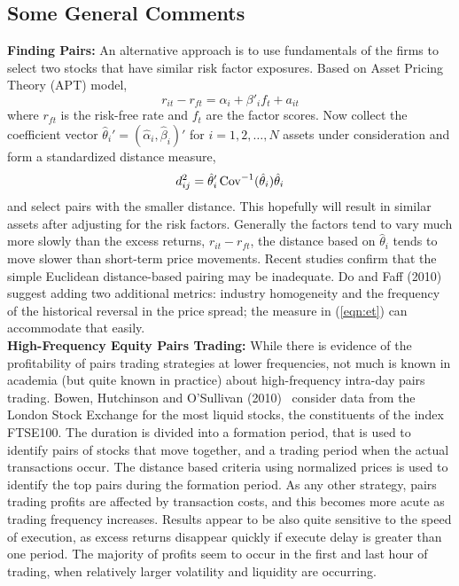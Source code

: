 \subsection{Some General Comments}


\noindent\textbf{Finding Pairs:} An alternative approach is to use fundamentals of the firms to select two stocks that have similar risk factor exposures. Based on Asset Pricing Theory (APT) model,
	\begin{equation}
	r_{it} - r_{ft} = \alpha_i + \beta'_if_t + a_{it}
	\end{equation}
where $r_{ft}$ is the risk-free rate and $f_t$ are the factor scores. Now collect the coefficient vector $\hat{\theta}_i' = (\hat{\alpha}_i, \hat{\beta}_i)'$ for $i = 1,2,\ldots,N$ assets under consideration and form a standardized distance measure,
	\begin{equation}
	d_{ij}^2 = \hat{\theta}_i' \operatorname{Cov}^{-1}(\hat{\theta}_i)\hat{\theta}_i
	\end{equation}
and select pairs with the smaller distance. This hopefully will result in similar assets after adjusting for the risk factors. Generally the factors tend to vary much more slowly than the excess returns, $r_{it} - r_{ft}$, the distance based on $\hat{\theta}_i$ tends to move slower than short-term price movements. Recent studies confirm that the simple Euclidean distance-based pairing may be inadequate. Do and Faff (2010)~\cite{do2010does} suggest adding two additional metrics: industry homogeneity and the frequency of the historical reversal in the price spread; the measure in (\ref{eqn:et}) can accommodate that easily. \\

\noindent\textbf{High-Frequency Equity Pairs Trading:} While there is evidence of the profitability of pairs trading strategies at lower frequencies, not much is known in academia (but quite known in practice) about high-frequency intra-day pairs trading. Bowen, Hutchinson and O'Sullivan (2010)~\cite{bho} consider data from the London Stock Exchange for the most liquid stocks, the constituents of the index FTSE100. The duration is divided into a formation period, that is used to identify pairs of stocks that move together, and a trading period when the actual transactions occur. The distance based criteria using normalized prices is used to identify the top pairs during the formation period. As any other strategy, pairs trading profits are affected by transaction costs, and this becomes more acute as trading frequency increases. Results appear to be also quite sensitive to the speed of execution, as excess returns disappear quickly if execute delay is greater than one period. The majority of profits seem to occur in the first and last hour of trading, when relatively larger volatility and liquidity are occurring.


